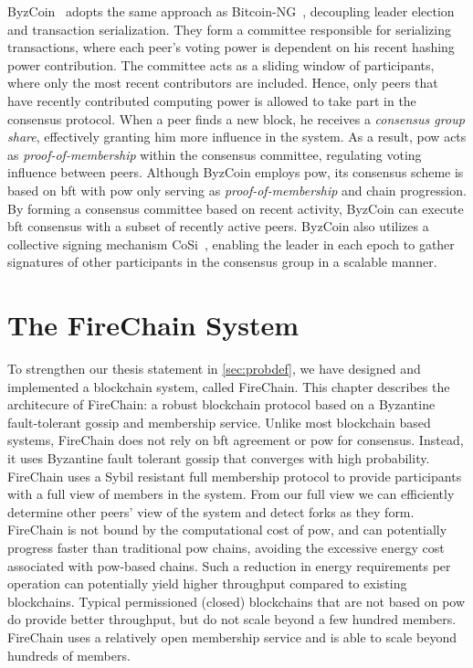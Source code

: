 \documentclass[USenglish]{uit-thesis}
\begin{document}


ByzCoin~\cite{byz} adopts the same approach as Bitcoin-NG~\cite{ng}, decoupling leader election and transaction serialization.
They form a committee responsible for serializing transactions, where each peer's voting power is dependent on his recent hashing power contribution.
The committee acts as a sliding window of participants, where only the most recent contributors are included.
Hence, only peers that have recently contributed computing power is allowed to take part in the consensus protocol.
When a peer finds a new block, he receives a \textit{consensus group share}, effectively granting him more influence in the system.
As a result, \gls{pow} acts as \textit{proof-of-membership} within the consensus committee, regulating voting influence between peers.
Although ByzCoin employs \gls{pow}, its consensus scheme is based on \gls{bft} with \gls{pow} only serving as \textit{proof-of-membership} and chain progression.
By forming a consensus committee based on recent activity, ByzCoin can execute \gls{bft} consensus with a subset of recently active peers.
ByzCoin also utilizes a collective signing mechanism CoSi~\cite{cos}, enabling the leader in each epoch to gather signatures of other participants in the consensus group in a scalable manner.



\chapter{The FireChain System}\label{chap:firearch}

To strengthen our thesis statement in \autoref{sec:probdef}, we have designed and implemented a blockchain system, called FireChain.
This chapter describes the architecure of FireChain: a robust blockchain protocol based on a Byzantine fault-tolerant gossip and membership service.
Unlike most blockchain based systems, FireChain does not rely on \gls{bft} agreement or \acrfull{pow} for consensus. 
Instead, it uses Byzantine fault tolerant gossip that converges with high probability. 
FireChain uses a Sybil resistant full membership protocol to provide participants with a full view of members in the system.
From our full view we can efficiently determine other peers' view of the system and detect forks as they form. 
FireChain is not bound by the computational cost of \gls{pow}, and can potentially progress faster than traditional \gls{pow} chains, avoiding the excessive energy cost associated with \gls{pow}-based chains.
Such a reduction in energy requirements per operation can potentially yield higher throughput compared to existing blockchains.  
Typical permissioned (closed) blockchains that are not based on \gls{pow} do provide better throughput, but do not scale beyond a few hundred members.
FireChain uses a relatively open membership service and is able to scale beyond hundreds of members.
\end{document}

